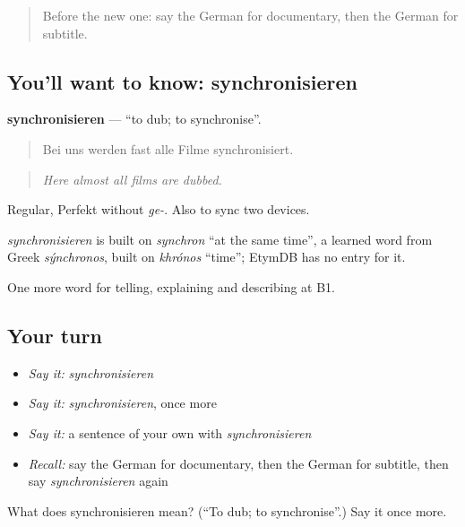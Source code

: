 \begin{quote}
Before the new one: say the German for documentary, then the German for subtitle.
\end{quote}

\subsection*{You'll want to know: synchronisieren}
\textbf{synchronisieren} — \textquotedblleft{}to dub; to synchronise\textquotedblright{}.

\begin{quote}
Bei uns werden fast alle Filme synchronisiert.
\end{quote}

\begin{quote}
\emph{Here almost all films are dubbed.}
\end{quote}

Regular, Perfekt without \emph{ge-}. Also to sync two devices.

\begin{cousinweb}
\emph{synchronisieren} is built on \emph{synchron} \textquotedblleft{}at the same time\textquotedblright{}, a learned word from Greek \emph{sýnchronos}, built on \emph{khrónos} \textquotedblleft{}time\textquotedblright{}; EtymDB has no entry for it.
\end{cousinweb}

\begin{grammarlens}[title={What you've built}]
One more word for telling, explaining and describing at B1.
\end{grammarlens}

\subsection*{Your turn}
\begin{itemize}
\raggedright
  \item \emph{Say it:} \emph{synchronisieren}
  \item \emph{Say it:} \emph{synchronisieren}, once more
  \item \emph{Say it:} a sentence of your own with \emph{synchronisieren}
  \item \emph{Recall:} say the German for documentary, then the German for subtitle, then say \emph{synchronisieren} again
\end{itemize}

\begin{tcolorbox}[breakable,colback=teal!4,colframe=teal!35!black,title={Before you move on}]
What does synchronisieren mean? (\textquotedblleft{}To dub; to synchronise\textquotedblright{}.) Say it once more.
\end{tcolorbox}
